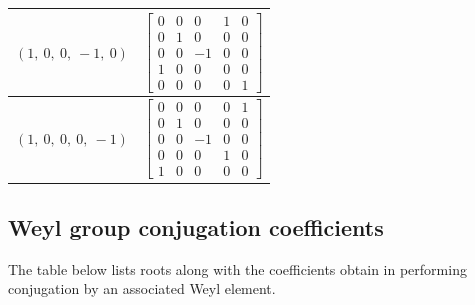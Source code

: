 \documentclass[11pt]{article}
\theoremstyle{definition}
\begin{document}
\begin{longtable}{|l|c|}
    \hline
    $\left( 1, \  0, \  0, \  -1, \  0\right)$ & ${\left[\begin{matrix}0 & 0 & 0 & 1 & 0\\0 & 1 & 0 & 0 & 0\\0 & 0 & -1 & 0 & 0\\1 & 0 & 0 & 0 & 0\\0 & 0 & 0 & 0 & 1\end{matrix}\right]}$ \\
    \hline
    $\left( 1, \  0, \  0, \  0, \  -1\right)$ & ${\left[\begin{matrix}0 & 0 & 0 & 0 & 1\\0 & 1 & 0 & 0 & 0\\0 & 0 & -1 & 0 & 0\\0 & 0 & 0 & 1 & 0\\1 & 0 & 0 & 0 & 0\end{matrix}\right]}$ \\
    \hline
\end{longtable}


\subsection{Weyl group conjugation coefficients}

The table below lists roots along with the coefficients obtain in performing conjugation by an associated Weyl element.

\bigskip
\end{document}
